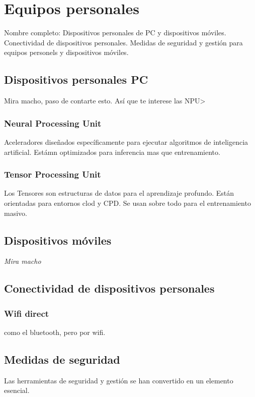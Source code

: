 \setcounter{section}{53}
\section{Equipos personales}

Nombre completo: Dispositivos personales de PC y dispositivos móviles. Conectividad de dispositivos personales. Medidas de seguridad y gestión para equipos personels y dispositivos móviles.

\localtableofcontents

\subsection{Dispositivos personales PC}
Mira macho, paso de contarte esto. Así que te interese las NPU>

\subsubsection{Neural Processing Unit}
Aceleradores diseñados específicamente para ejecutar algoritmos de inteligencia artificial. Estámn optimizados para inferencia mas que entrenamiento. 

\subsubsection{Tensor Processing Unit}
Los Tensores son estructuras de datos para el aprendizaje profundo. Están orientadas para entornos clod y CPD. Se usan sobre todo para el entrenamiento masivo.

\subsection{Dispositivos móviles}

\textit{Mira macho}

\subsection{Conectividad de dispositivos personales}

\subsubsection{Wifi direct}
como el bluetooth, pero por wifi.

\subsection{Medidas de seguridad}
Las herramientas de seguridad y gestión se han convertido en un elemento esencial.

